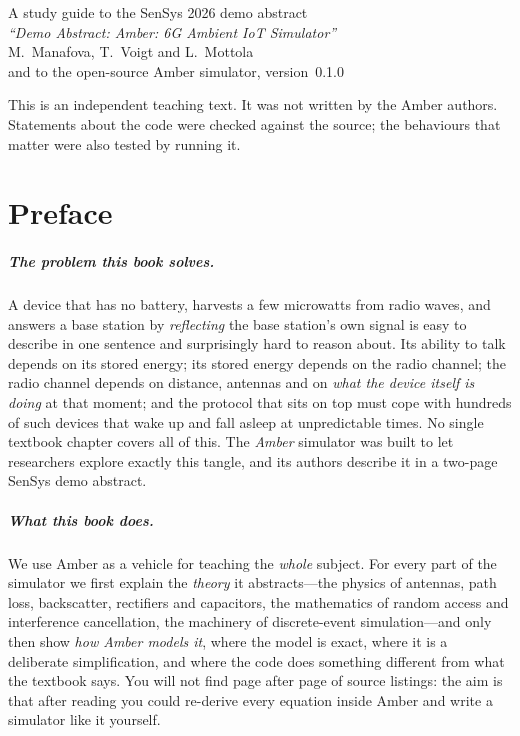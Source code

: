\begin{titlepage}
\begin{center}
\vfill
{\sffamily\large
A study guide to the SenSys 2026 demo abstract\\[3pt]
\emph{``Demo Abstract: Amber: 6G Ambient IoT Simulator''}\\[2pt]
M.\ Manafova, T.\ Voigt and L.\ Mottola\\[10pt]
and to the open-source Amber simulator, version~0.1.0\par}
\vspace{0.6cm}
{\sffamily\small\color{agrey}
This is an independent teaching text. It was not written by the Amber authors.\\
Statements about the code were checked against the source; the behaviours that matter were also tested by running it.\par}
\vspace{0.4cm}
\end{center}
\end{titlepage}

\frontmatter

\chapter*{Preface}

\paragraph{The problem this book solves.}
A device that has no battery, harvests a few microwatts from radio waves, and
answers a base station by \emph{reflecting} the base station's own signal is
easy to describe in one sentence and surprisingly hard to reason about. Its
ability to talk depends on its stored energy; its stored energy depends on
the radio channel; the radio channel depends on distance, antennas and on
\emph{what the device itself is doing} at that moment; and the protocol that
sits on top must cope with hundreds of such devices that wake up and fall
asleep at unpredictable times. No single textbook chapter covers all of this.
The \emph{Amber} simulator was built to let researchers explore exactly this
tangle, and its authors describe it in a two-page SenSys demo abstract.

\paragraph{What this book does.}
We use Amber as a vehicle for teaching the \emph{whole} subject. For every
part of the simulator we first explain the \emph{theory} it abstracts---the
physics of antennas, path loss, backscatter, rectifiers and capacitors, the
mathematics of random access and interference cancellation, the machinery of
discrete-event simulation---and only then show \emph{how Amber models it},
where the model is exact, where it is a deliberate simplification, and where
the code does something different from what the textbook says. You will not
find page after page of source listings: the aim is that after reading you
could re-derive every equation inside Amber and write a simulator like it
yourself.

